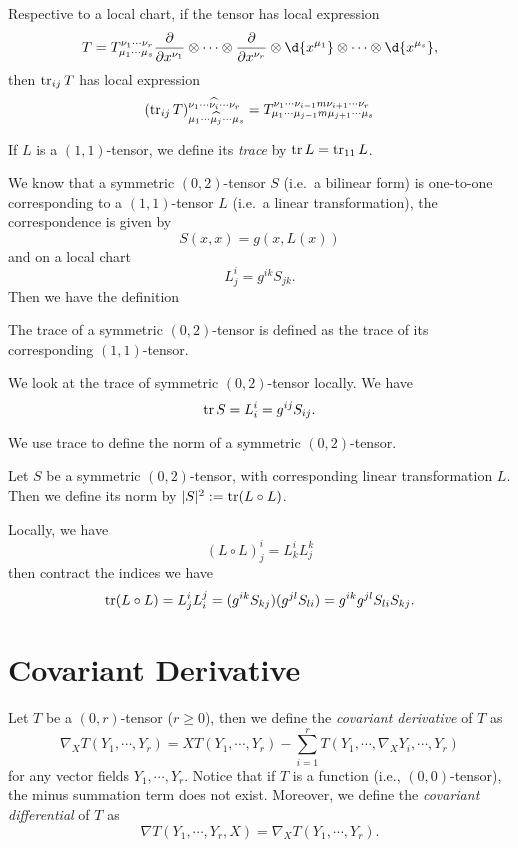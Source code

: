 Respective to a local chart, if the tensor has local expression
\[T=T_{\mu_1\cdots\mu_s}^{\nu_1\cdots\nu_r}\frac{\partial{}}{\partial{x^{\nu_1}}}\otimes\cdots\otimes\frac{\partial{}}{\partial{x^{\nu_r}}}\otimes\d{x^{\mu_1}}\otimes\cdots\otimes\d{x^{\mu_s}},\]
then $\operatorname{tr}_{ij}T$ has local expression
\[(\operatorname{tr}_{ij}T)_{\mu_1\cdots\widehat{\mu_{j}}\cdots\mu_s}^{\nu_1\cdots\widehat{\nu_{i}}\cdots\nu_r}=T_{\mu_1\cdots\mu_{j-1}m\mu_{j+1}\cdots\mu_s}^{\nu_1\cdots\nu_{i-1}m\nu_{i+1}\cdots\nu_r}\]

\begin{defn}
    If $L$ is a $(1,1)$-tensor, we define its \emph{trace} by $\operatorname{tr}{L}=\operatorname{tr}_{11}L$.
\end{defn}

We know that a symmetric $(0,2)$-tensor $S$ (i.e.\ a bilinear form) is one-to-one corresponding to a $(1,1)$-tensor $L$ (i.e.\ a linear transformation), the correspondence is given by
\[S(x,x)=g(x,L(x))\]
and on a local chart
\[L^i_j=g^{ik}S_{jk}.\]
Then we have the definition

\begin{defn}
    The trace of a symmetric $(0,2)$-tensor is defined as the trace of its corresponding $(1,1)$-tensor.
\end{defn}

We look at the trace of symmetric $(0,2)$-tensor locally.
We have
\[\operatorname{tr}{S}=L^i_i=g^{ij}S_{ij}.\]

We use trace to define the norm of a symmetric $(0,2)$-tensor.
\begin{defn}
    Let $S$ be a symmetric $(0,2)$-tensor, with corresponding linear transformation $L$.
    Then we define its norm by $|S|^2:=\operatorname{tr}(L\circ L)$.
\end{defn}

Locally, we have
\[(L\circ L)^i_j=L^i_kL^k_j\]
then contract the indices we have
\[\operatorname{tr}(L\circ L)=L^i_jL^j_i=(g^{ik}S_{kj})(g^{jl}S_{li})=g^{ik}g^{jl}S_{li}S_{kj}.\]

\section{Covariant Derivative}

\begin{defn}
    Let $T$ be a $(0,r)$-tensor ($r\geq 0$), then we define the \emph{covariant derivative} of $T$ as
    \[\nabla_XT(Y_1,\cdots,Y_r)=XT(Y_1,\cdots,Y_r)-\sum_{i=1}^rT(Y_1,\cdots,\nabla_XY_i,\cdots,Y_r)\]
    for any vector fields $Y_1,\cdots,Y_r$.
    Notice that if $T$ is a function (i.e., $(0,0)$-tensor), the minus summation term does not exist.
    Moreover, we define the \emph{covariant differential} of $T$ as
    \[\nabla T(Y_1,\cdots,Y_r,X)=\nabla_XT(Y_1,\cdots,Y_r).\]
\end{defn}

